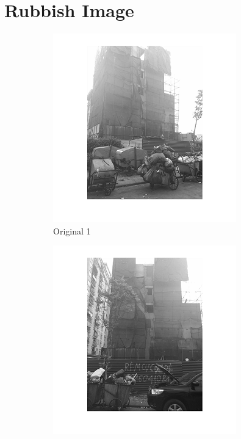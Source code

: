 \section*{Rubbish Image}
\begin{center}
\begin{figure}[h]
        \begin{subfigure}[b]{0.18\textwidth}
                \includegraphics[width=\linewidth]{rubbish1.png}
                \caption{Original 1}
                \label{fig:original 1}
        \end{subfigure}%
        \begin{subfigure}[b]{0.18\textwidth}
                \includegraphics[width=\linewidth]{rubbish2.png}

\end{subfigure}
\end{figure}
\end{center}

